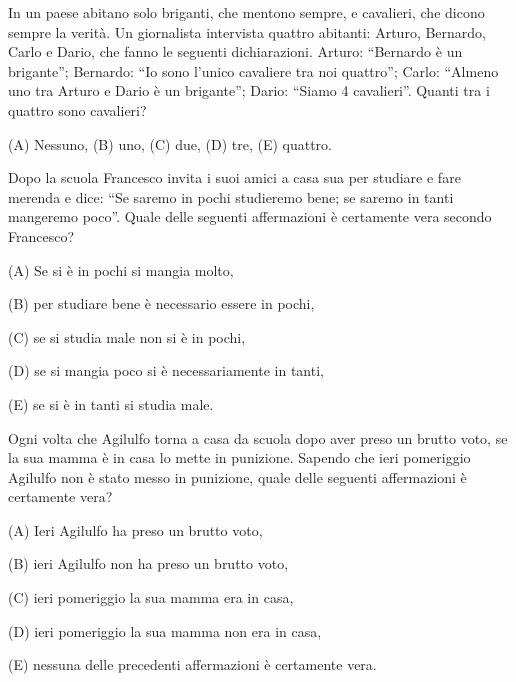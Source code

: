 \begin{esercizio}
    \label{ex:archimede_2007_biennio_19}
    In un paese abitano solo briganti, che mentono sempre, e cavalieri, che dicono sempre la verità.
    Un giornalista intervista quattro abitanti: Arturo, Bernardo, Carlo e Dario, che fanno le seguenti dichiarazioni.
    Arturo: “Bernardo è un brigante”;
    Bernardo: “Io sono l’unico cavaliere tra noi quattro”;
    Carlo: “Almeno uno tra Arturo e Dario è un brigante”;
    Dario: “Siamo 4 cavalieri”.
    Quanti tra i quattro sono cavalieri?

    (A) Nessuno, \quad (B) uno, \quad (C) due, \quad (D) tre, \quad (E) quattro.
\end{esercizio}

\begin{esercizio}
    \label{ex:archimede_2007_triennio_22}
    Dopo la scuola Francesco invita i suoi amici a casa sua per studiare e fare merenda e dice:
    “Se saremo in pochi studieremo bene;
    se saremo in tanti mangeremo poco”.
    Quale delle seguenti affermazioni è certamente vera secondo Francesco?

    (A) Se si è in pochi si mangia molto,

    (B) per studiare bene è necessario essere in pochi,

    (C) se si studia male non si è in pochi,

    (D) se si mangia poco si è necessariamente in tanti,

    (E) se si è in tanti si studia male.
\end{esercizio}

\begin{esercizio}
    \label{ex:archimede_2008_triennio_21}
    Ogni volta che Agilulfo torna a casa da scuola dopo aver preso un brutto voto,
    se la sua mamma è in casa lo mette in punizione.
    Sapendo che ieri pomeriggio Agilulfo non è stato messo in punizione,
    quale delle seguenti affermazioni è certamente vera?

    (A) Ieri Agilulfo ha preso un brutto voto,

    (B) ieri Agilulfo non ha preso un brutto voto,

    (C) ieri pomeriggio la sua mamma era in casa,

    (D) ieri pomeriggio la sua mamma non era in casa,

    (E) nessuna delle precedenti affermazioni è certamente vera.
\end{esercizio}

